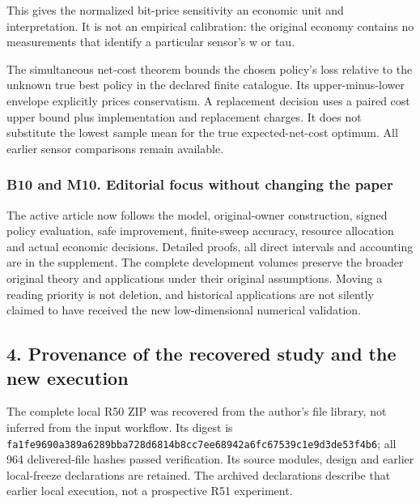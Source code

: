 This gives the normalized bit-price sensitivity an economic unit and
interpretation. It is not an empirical calibration: the original economy
contains no measurements that identify a particular sensor's w or tau.

The simultaneous net-cost theorem bounds the chosen policy's loss
relative to the unknown true best policy in the declared finite
catalogue. Its upper-minus-lower envelope explicitly prices
conservatism. A replacement decision uses a paired cost upper bound plus
implementation and replacement charges. It does not substitute the
lowest sample mean for the true expected-net-cost optimum. All earlier
sensor comparisons remain available.

\hypertarget{b10-and-m10.-editorial-focus-without-changing-the-paper}{%
\subsubsection{B10 and M10. Editorial focus without changing the
paper}\label{b10-and-m10.-editorial-focus-without-changing-the-paper}}

The active article now follows the model, original-owner construction,
signed policy evaluation, safe improvement, finite-sweep accuracy,
resource allocation and actual economic decisions. Detailed proofs, all
direct intervals and accounting are in the supplement. The complete
development volumes preserve the broader original theory and
applications under their original assumptions. Moving a reading priority
is not deletion, and historical applications are not silently claimed to
have received the new low-dimensional numerical validation.

\hypertarget{provenance-of-the-recovered-study-and-the-new-execution}{%
\subsection{4. Provenance of the recovered study and the new
execution}\label{provenance-of-the-recovered-study-and-the-new-execution}}

The complete local R50 ZIP was recovered from the author's file library,
not inferred from the input workflow. Its digest is
\texttt{fa1fe9690a389a6289bba728d6814b8cc7ee68942a6fc67539c1e9d3de53f4b6};
all 964 delivered-file hashes passed verification. Its source modules,
design and earlier local-freeze declarations are retained. The archived
declarations describe that earlier local execution, not a prospective
R51 experiment.


